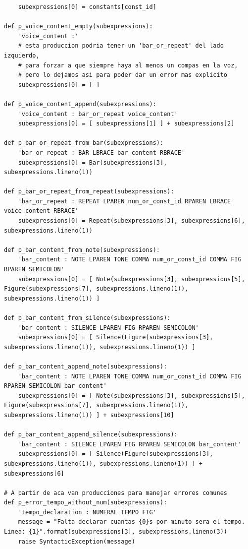 \documentclass[a4paper, 10pt, twoside]{article}
\begin{document}
\begin{verbatim}
    subexpressions[0] = constants[const_id]

def p_voice_content_empty(subexpressions):
    'voice_content :'
    # esta produccion podria tener un 'bar_or_repeat' del lado izquierdo,
    # para forzar a que siempre haya al menos un compas en la voz,
    # pero lo dejamos asi para poder dar un error mas explicito
    subexpressions[0] = [ ]

def p_voice_content_append(subexpressions):
    'voice_content : bar_or_repeat voice_content'
    subexpressions[0] = [ subexpressions[1] ] + subexpressions[2]
    
def p_bar_or_repeat_from_bar(subexpressions):
    'bar_or_repeat : BAR LBRACE bar_content RBRACE'
    subexpressions[0] = Bar(subexpressions[3], subexpressions.lineno(1))
    
def p_bar_or_repeat_from_repeat(subexpressions):
    'bar_or_repeat : REPEAT LPAREN num_or_const_id RPAREN LBRACE voice_content RBRACE'
    subexpressions[0] = Repeat(subexpressions[3], subexpressions[6], subexpressions.lineno(1))

def p_bar_content_from_note(subexpressions):
    'bar_content : NOTE LPAREN TONE COMMA num_or_const_id COMMA FIG RPAREN SEMICOLON'
    subexpressions[0] = [ Note(subexpressions[3], subexpressions[5], Figure(subexpressions[7], subexpressions.lineno(1)), subexpressions.lineno(1)) ]

def p_bar_content_from_silence(subexpressions):
    'bar_content : SILENCE LPAREN FIG RPAREN SEMICOLON'
    subexpressions[0] = [ Silence(Figure(subexpressions[3], subexpressions.lineno(1)), subexpressions.lineno(1)) ]

def p_bar_content_append_note(subexpressions):
    'bar_content : NOTE LPAREN TONE COMMA num_or_const_id COMMA FIG RPAREN SEMICOLON bar_content'
    subexpressions[0] = [ Note(subexpressions[3], subexpressions[5], Figure(subexpressions[7], subexpressions.lineno(1)), subexpressions.lineno(1)) ] + subexpressions[10]

def p_bar_content_append_silence(subexpressions):
    'bar_content : SILENCE LPAREN FIG RPAREN SEMICOLON bar_content'
    subexpressions[0] = [ Silence(Figure(subexpressions[3], subexpressions.lineno(1)), subexpressions.lineno(1)) ] + subexpressions[6]    

# A partir de aca van producciones para manejar errores comunes
def p_error_tempo_without_num(subexpressions):
    'tempo_declaration : NUMERAL TEMPO FIG'
    message = "Falta declarar cuantas {0}s por minuto sera el tempo. Linea: {1}".format(subexpressions[3], subexpressions.lineno(3))
    raise SyntacticException(message)
    

\end{verbatim}
\end{document}
